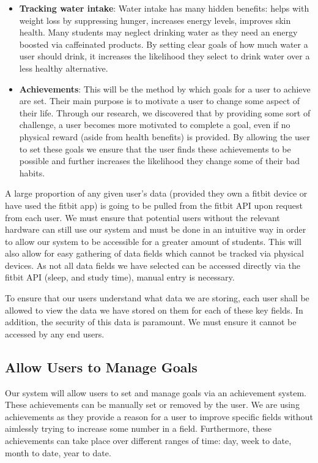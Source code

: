 \documentclass[12pt]{article}
\begin{document}
\begin{itemize}
    \item \textbf{Tracking water intake}: Water intake has many hidden benefits: helps with weight loss by suppressing hunger, increases energy levels, improves skin health. Many students may neglect drinking water as they need an energy boosted via caffeinated products. By setting clear goals of how much water a user should drink, it increases the likelihood they select to drink water over a less healthy alternative.

    \item \textbf{Achievements}: This will be the method by which goals for a user to achieve are set. Their main purpose is to motivate a user to change some aspect of their life. Through our research, we discovered that by providing some sort of challenge, a user becomes more motivated to complete a goal, even if no physical reward (aside from health benefits) is provided. By allowing the user to set these goals we ensure that the user finds these achievements to be possible and further increases the likelihood they change some of their bad habits.

\end{itemize}

A large proportion of any given user's data (provided they own a fitbit device or have used the fitbit app) is going to be pulled from the fitbit API upon request from each user. We must ensure that potential users without the relevant hardware can still use our system and must be done in an intuitive way in order to allow our system to be accessible for a greater amount of students. This will also allow for easy gathering of data fields which cannot be tracked via physical devices. As not all data fields we have selected can be accessed directly via the fitbit API (sleep, and study time), manual entry is necessary.\newline

To ensure that our users understand what data we are storing, each user shall be allowed to view the data we have stored on them for each of these key fields.
In addition, the security of this data is paramount. We must ensure it cannot be accessed by any end users.

\subsection{Allow Users to Manage Goals}
Our system will allow users to set and manage goals via an achievement system. These achievements can be manually set or removed by the user. We are using achievements as they provide a reason for a user to improve specific fields without aimlessly trying to increase some number in a field. Furthermore, these achievements can take place over different ranges of time: day, week to date, month to date, year to date.
    
\end{document}
